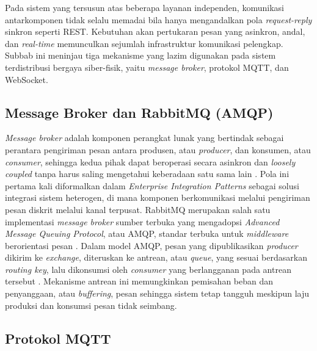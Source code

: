 Pada sistem yang tersusun atas beberapa layanan independen, komunikasi antarkomponen tidak selalu memadai bila hanya mengandalkan pola \textit{request-reply} sinkron seperti REST. Kebutuhan akan pertukaran pesan yang asinkron, andal, dan \textit{real-time} memunculkan sejumlah infrastruktur komunikasi pelengkap. Subbab ini meninjau tiga mekanisme yang lazim digunakan pada sistem terdistribusi bergaya siber-fisik, yaitu \textit{message broker}, protokol MQTT, dan WebSocket.

\subsection{Message Broker dan RabbitMQ (AMQP)}

\textit{Message broker} adalah komponen perangkat lunak yang bertindak sebagai perantara pengiriman pesan antara produsen, atau \textit{producer}, dan konsumen, atau \textit{consumer}, sehingga kedua pihak dapat beroperasi secara asinkron dan \textit{loosely coupled} tanpa harus saling mengetahui keberadaan satu sama lain \autocite{hohpe2003}. Pola ini pertama kali diformalkan dalam \textit{Enterprise Integration Patterns} sebagai solusi integrasi sistem heterogen, di mana komponen berkomunikasi melalui pengiriman pesan diskrit melalui kanal terpusat. RabbitMQ merupakan salah satu implementasi \textit{message broker} sumber terbuka yang mengadopsi \textit{Advanced Message Queuing Protocol}, atau AMQP, standar terbuka untuk \textit{middleware} berorientasi pesan \autocite{oasis2012}. Dalam model AMQP, pesan yang dipublikasikan \textit{producer} dikirim ke \textit{exchange}, diteruskan ke antrean, atau \textit{queue}, yang sesuai berdasarkan \textit{routing key}, lalu dikonsumsi oleh \textit{consumer} yang berlangganan pada antrean tersebut \autocite{rabbitmq2023}. Mekanisme antrean ini memungkinkan pemisahan beban dan penyanggaan, atau \textit{buffering}, pesan sehingga sistem tetap tangguh meskipun laju produksi dan konsumsi pesan tidak seimbang.

\subsection{Protokol MQTT}

